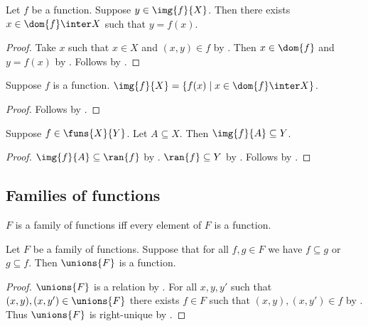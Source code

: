 \begin{proposition}\label{img_of_function_elim}
    Let $f$ be a function.
    Suppose $y\in \img{f}{X}$.
    Then there exists $x\in\dom{f}\inter X$ such that $y = f(x)$.
\end{proposition}
\begin{proof}
    Take $x$ such that $x\in X$ and $(x,y)\in f$ by .
    Then $x\in\dom{f}$ and $y = f(x)$ by .
    Follows by .
\end{proof}

\begin{proposition}\label{img_of_function}
    Suppose $f$ is a function.
    $\img{f}{X} = \{ f(x) \mid x\in\dom{f}\inter X\}$.
\end{proposition}
\begin{proof}
    Follows by .
\end{proof}

\begin{classification}\label{funs_image_subseteq}
    Suppose $f\in\funs{X}{Y}$.
    Let $A\subseteq X$.
    Then $\img{f}{A}\subseteq Y$.
\end{classification}
\begin{proof}
    $\img{f}{A}\subseteq\ran{f}$ by .
    $\ran{f}\subseteq Y$ by .
    Follows by .
\end{proof}

\subsection{Families of functions}

\begin{abbreviation}\label{family_of_functions}
    $F$ is a family of functions iff
    every element of $F$ is a function.
\end{abbreviation}

\begin{proposition}\label{unions_of_compatible_family_of_function_is_function}
    Let $F$ be a family of functions.
    Suppose that for all $f,g \in F$ we have $f\subseteq g$ or $g\subseteq f$.
    Then $\unions{F}$ is a function.
\end{proposition}
\begin{proof}
    $\unions{F}$ is a relation by .
    For all $x,y, y'$ such that $(x,y),(x,y')\in \unions{F}$
        there exists $f\in F$ such that $(x,y),(x,y')\in f$
        by .
    Thus $\unions{F}$ is right-unique by .
\end{proof}


